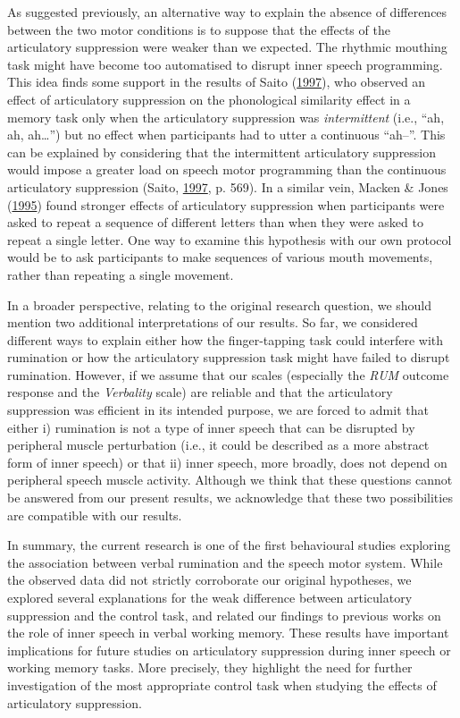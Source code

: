 \documentclass[a4paper,12pt,twoside,openright,oldfontcommands]{memoir}
\begin{document}
As suggested previously, an alternative way to explain the absence of differences between the two motor conditions is to suppose that the effects of the articulatory suppression were weaker than we expected. The rhythmic mouthing task might have become too automatised to disrupt inner speech programming. This idea finds some support in the results of Saito (\protect\hyperlink{ref-saito_when_1997}{1997}), who observed an effect of articulatory suppression on the phonological similarity effect in a memory task only when the articulatory suppression was \emph{intermittent} (i.e., \enquote{ah, ah, ah\ldots{}}) but no effect when participants had to utter a continuous \enquote{ah--}. This can be explained by considering that the intermittent articulatory suppression would impose a greater load on speech motor programming than the continuous articulatory suppression (Saito, \protect\hyperlink{ref-saito_when_1997}{1997}, p. 569). In a similar vein, Macken \& Jones (\protect\hyperlink{ref-macken_functional_1995}{1995}) found stronger effects of articulatory suppression when participants were asked to repeat a sequence of different letters than when they were asked to repeat a single letter. One way to examine this hypothesis with our own protocol would be to ask participants to make sequences of various mouth movements, rather than repeating a single movement.

In a broader perspective, relating to the original research question, we should mention two additional interpretations of our results. So far, we considered different ways to explain either how the finger-tapping task could interfere with rumination or how the articulatory suppression task might have failed to disrupt rumination. However, if we assume that our scales (especially the \emph{RUM} outcome response and the \emph{Verbality} scale) are reliable and that the articulatory suppression was efficient in its intended purpose, we are forced to admit that either i) rumination is not a type of inner speech that can be disrupted by peripheral muscle perturbation (i.e., it could be described as a more abstract form of inner speech) or that ii) inner speech, more broadly, does not depend on peripheral speech muscle activity. Although we think that these questions cannot be answered from our present results, we acknowledge that these two possibilities are compatible with our results.

In summary, the current research is one of the first behavioural studies exploring the association between verbal rumination and the speech motor system. While the observed data did not strictly corroborate our original hypotheses, we explored several explanations for the weak difference between articulatory suppression and the control task, and related our findings to previous works on the role of inner speech in verbal working memory. These results have important implications for future studies on articulatory suppression during inner speech or working memory tasks. More precisely, they highlight the need for further investigation of the most appropriate control task when studying the effects of articulatory suppression.
\end{document}
